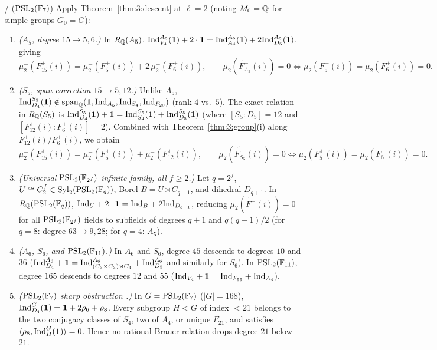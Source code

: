 \begin{theorem}\label{thm:3:catalog}
\tagProved{} / \tagObs{} \textup{($\mathrm{PSL}_2(\mathbb{F}_7)$)}
Apply Theorem~\ref{thm:3:descent} at $\ell = 2$ (noting $M_0 = \mathbb{Q}$ for simple groups $G_0 = G$):
\begin{enumerate}[label=\textup{(\roman*)}]
\item \emph{($A_5$, degree $15 \to 5, 6$.)} In $R_{\mathbb{Q}}(A_5)$, $\mathrm{Ind}_{V_4}^{A_5}(\mathbf{1}) + 2\cdot\mathbf{1} = \mathrm{Ind}_{A_4}^{A_5}(\mathbf{1}) + 2\mathrm{Ind}_{D_5}^{A_5}(\mathbf{1})$, giving
\[
  \mu_2^-(F_{15}^+(i)) = \mu_2^-(F_5^+(i)) + 2\,\mu_2^-(F_6^+(i)), \qquad \mu_2(\widetilde{F_{A_5}^+}(i)) = 0 \iff \mu_2(F_5^+(i)) = \mu_2(F_6^+(i)) = 0.
\]
\item \emph{($S_5$, span correction $15 \to 5, 12$.)} Unlike $A_5$, $\mathrm{Ind}_{D_4}^{S_5}(\mathbf{1}) \notin \mathrm{span}_{\mathbb{Q}}(\mathbf{1}, \mathrm{Ind}_{A_5}, \mathrm{Ind}_{S_4}, \mathrm{Ind}_{F_{20}})$ (rank $4$ vs.\ $5$). The exact relation in $R_{\mathbb{Q}}(S_5)$ is $\mathrm{Ind}_{D_4}^{S_5}(\mathbf{1}) + \mathbf{1} = \mathrm{Ind}_{S_4}^{S_5}(\mathbf{1}) + \mathrm{Ind}_{D_5}^{S_5}(\mathbf{1})$ (where $[S_5:D_5] = 12$ and $[F_{12}^+(i):F_6^+(i)] = 2$). Combined with Theorem~\ref{thm:3:group}(i) along $F_{12}^+(i)/F_6^+(i)$, we obtain
\[
  \mu_2^-(F_{15}^+(i)) = \mu_2^-(F_5^+(i)) + \mu_2^-(F_{12}^+(i)), \qquad \mu_2(\widetilde{F_{S_5}^+}(i)) = 0 \iff \mu_2(F_5^+(i)) = \mu_2(F_6^+(i)) = 0.
\]
\item \emph{(Universal $\mathrm{PSL}_2(\mathbb{F}_{2^f})$ infinite family, all $f \ge 2$.)} Let $q = 2^f$, $U \cong C_2^f \in \mathrm{Syl}_2(\mathrm{PSL}_2(\mathbb{F}_q))$, Borel $B = U \rtimes C_{q-1}$, and dihedral $D_{q+1}$. In $R_{\mathbb{Q}}(\mathrm{PSL}_2(\mathbb{F}_q))$, $\mathrm{Ind}_U + 2\cdot\mathbf{1} = \mathrm{Ind}_B + 2\mathrm{Ind}_{D_{q+1}}$, reducing $\mu_2(\widetilde{F^+}(i)) = 0$ for all $\mathrm{PSL}_2(\mathbb{F}_{2^f})$ fields to subfields of degrees $q+1$ and $q(q-1)/2$ (for $q=8$: degree $63 \to 9, 28$; for $q=4$: $A_5$).
\item \emph{($A_6$, $S_6$, and $\mathrm{PSL}_2(\mathbb{F}_{11})$.)} In $A_6$ and $S_6$, degree $45$ descends to degrees $10$ and $36$ ($\mathrm{Ind}_{D_4}^{A_6} + \mathbf{1} = \mathrm{Ind}_{(C_3\times C_3)\rtimes C_4}^{A_6} + \mathrm{Ind}_{D_5}^{A_6}$ and similarly for $S_6$). In $\mathrm{PSL}_2(\mathbb{F}_{11})$, degree $165$ descends to degrees $12$ and $55$ ($\mathrm{Ind}_{V_4} + \mathbf{1} = \mathrm{Ind}_{F_{55}} + \mathrm{Ind}_{A_4}$).
\item \emph{($\mathrm{PSL}_2(\mathbb{F}_7)$ sharp obstruction \tagObs{}.)} In $G = \mathrm{PSL}_2(\mathbb{F}_7)$ ($|G| = 168$), $\mathrm{Ind}_{D_4}^G(\mathbf{1}) = \mathbf{1} + 2\rho_6 + \rho_8$. Every subgroup $H < G$ of index $< 21$ belongs to the two conjugacy classes of $S_4$, two of $A_4$, or unique $F_{21}$, and satisfies $\langle \rho_8, \mathrm{Ind}_H^G(\mathbf{1}) \rangle = 0$. Hence no rational Brauer relation drops degree $21$ below $21$.
\end{enumerate}
\end{theorem}
